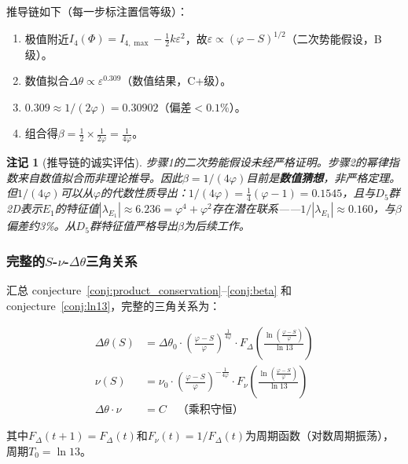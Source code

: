 \documentclass[12pt,a4paper,twocolumn]{article}
\renewcommand{\phi}{\varphi}
\newtheorem{remark}[theorem]{注记}
\begin{document}
推导链如下（每一步标注置信等级）：
\begin{enumerate}
\item 极值附近$I_4(\Phi) = I_{4,\max} - \frac{1}{2}k\varepsilon^2$，故$\varepsilon \propto (\phi - S)^{1/2}$（二次势能假设，B级）。
\item 数值拟合$\Delta\theta \propto \varepsilon^{0.309}$（数值结果，C+级）。
\item $0.309 \approx 1/(2\phi) = 0.30902$（偏差$<0.1\%$）。
\item 组合得$\beta = \frac{1}{2} \times \frac{1}{2\phi} = \frac{1}{4\phi}$。
\end{enumerate}

\begin{remark}[推导链的诚实评估]
步骤1的二次势能假设未经严格证明。步骤2的幂律指数来自数值拟合而非理论推导。因此$\beta = 1/(4\phi)$目前是\textbf{数值猜想}，非严格定理。但$1/(4\phi)$可以从$\phi$的代数性质导出：$1/(4\phi) = \frac{1}{4}(\phi - 1) = 0.1545$，且与$D_5$群2D表示$E_1$的特征值$|\lambda_{E_1}| \approx 6.236 = \phi^4 + \phi^2$存在潜在联系——$1/|\lambda_{E_1}| \approx 0.160$，与$\beta$偏差约3\%。从$D_5$群特征值严格导出$\beta$为后续工作。
\end{remark}

\subsubsection{完整的$S$-$\nu$-$\Delta\theta$三角关系}

汇总 conjecture~\ref{conj:product_conservation}--\ref{conj:beta} 和 conjecture~\ref{conj:ln13}，完整的三角关系为：

\begin{equation}
\boxed{
\begin{aligned}
\Delta\theta(S) &= \Delta\theta_0 \cdot \left(\frac{\phi - S}{\phi}\right)^{\frac{1}{4\phi}} \cdot F_\Delta\!\left(\frac{\ln\!\left(\frac{\phi-S}{\phi}\right)}{\ln 13}\right) \\[6pt]
\nu(S) &= \nu_0 \cdot \left(\frac{\phi - S}{\phi}\right)^{-\frac{1}{4\phi}} \cdot F_\nu\!\left(\frac{\ln\!\left(\frac{\phi-S}{\phi}\right)}{\ln 13}\right) \\[6pt]
\Delta\theta \cdot \nu &= C \quad \text{（乘积守恒）}
\end{aligned}
}
\label{eq:triangle_relation}
\end{equation}

其中$F_\Delta(t+1) = F_\Delta(t)$和$F_\nu(t) = 1/F_\Delta(t)$为周期函数（对数周期振荡），周期$T_0 = \ln 13$。
\end{document}
